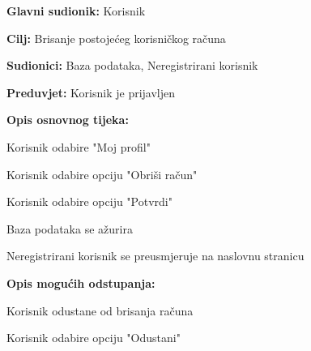 					\noindent {}
					\begin{packed_item}
						
						\item \textbf{Glavni sudionik: }Korisnik
						\item  \textbf{Cilj:} Brisanje postojećeg korisničkog računa
						\item  \textbf{Sudionici:} Baza podataka, Neregistrirani korisnik
						\item  \textbf{Preduvjet:} Korisnik je prijavljen
						\item  \textbf{Opis osnovnog tijeka:}
						
						\item[] \begin{packed_enum}
							
							\item Korisnik odabire "Moj profil"
							\item Korisnik odabire opciju "Obriši račun"
							\item Korisnik odabire opciju "Potvrdi"
							\item Baza podataka se ažurira
							\item Neregistrirani korisnik se preusmjeruje na naslovnu stranicu
						\end{packed_enum}
						
						\item  \textbf{Opis mogućih odstupanja:}
						
						\item[] \begin{packed_item}
							
							\item[3.a] Korisnik odustane od brisanja računa
							\item[] \begin{packed_enum}
								
								\item Korisnik odabire opciju "Odustani"
								
							\end{packed_enum}
							
						\end{packed_item}
					\end{packed_item}
					
